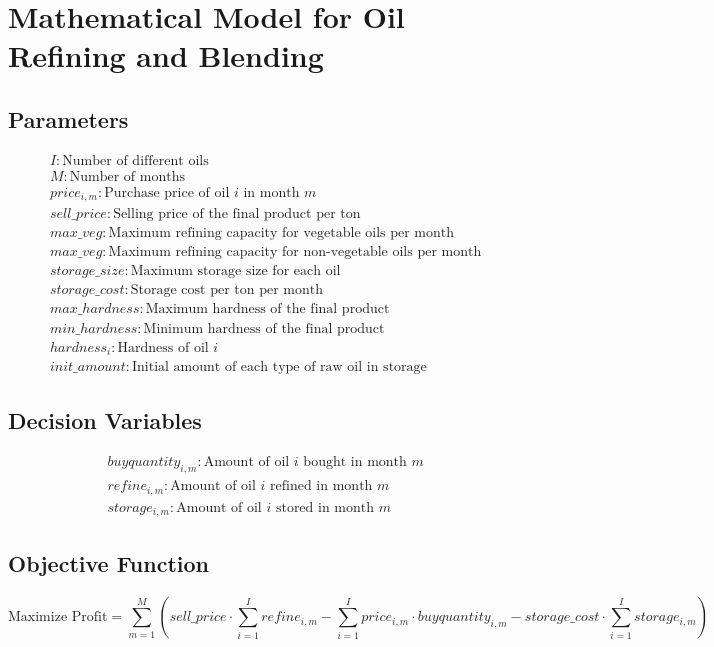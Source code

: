 \documentclass{article}
\begin{document}
\section*{Mathematical Model for Oil Refining and Blending}

\subsection*{Parameters}
\begin{align*}
& I: \text{Number of different oils} \\
& M: \text{Number of months} \\
& price_{i,m}: \text{Purchase price of oil } i \text{ in month } m \\
& sell\_price: \text{Selling price of the final product per ton} \\
& max\_veg: \text{Maximum refining capacity for vegetable oils per month} \\
& max\_veg: \text{Maximum refining capacity for non-vegetable oils per month} \\
& storage\_size: \text{Maximum storage size for each oil} \\
& storage\_cost: \text{Storage cost per ton per month} \\
& max\_hardness: \text{Maximum hardness of the final product} \\
& min\_hardness: \text{Minimum hardness of the final product} \\
& hardness_{i}: \text{Hardness of oil } i \\
& init\_amount: \text{Initial amount of each type of raw oil in storage}
\end{align*}

\subsection*{Decision Variables}
\begin{align*}
& buyquantity_{i,m}: \text{Amount of oil } i \text{ bought in month } m \\
& refine_{i,m}: \text{Amount of oil } i \text{ refined in month } m \\
& storage_{i,m}: \text{Amount of oil } i \text{ stored in month } m
\end{align*}

\subsection*{Objective Function}
\[
\text{Maximize Profit} = \sum_{m=1}^{M} \left( sell\_price \cdot \sum_{i=1}^{I} refine_{i,m} - \sum_{i=1}^{I} price_{i,m} \cdot buyquantity_{i,m} - storage\_cost \cdot \sum_{i=1}^{I} storage_{i,m} \right)
\]
\end{document}
